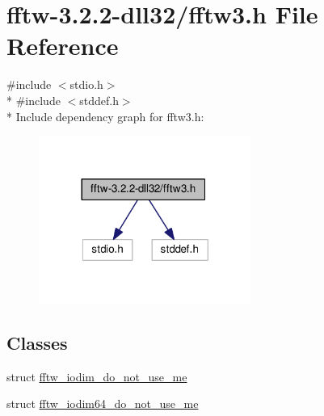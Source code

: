 \hypertarget{fftw-3_82_82-dll32_2fftw3_8h}{\section{fftw-\/3.2.2-\/dll32/fftw3.h File Reference}
\label{fftw-3_82_82-dll32_2fftw3_8h}
}
{\ttfamily \#include $<$stdio.\-h$>$}\\*
{\ttfamily \#include $<$stddef.\-h$>$}\\*
Include dependency graph for fftw3.\-h\-:
\nopagebreak
\begin{figure}[H]
\begin{center}
\leavevmode
\includegraphics[width=197pt]{fftw-3_82_82-dll32_2fftw3_8h__incl}
\end{center}
\end{figure}
\subsection*{Classes}
\begin{DoxyCompactItemize}
\item 
struct \hyperlink{structfftw__iodim__do__not__use__me}{fftw\-\_\-iodim\-\_\-do\-\_\-not\-\_\-use\-\_\-me}
\item 
struct \hyperlink{structfftw__iodim64__do__not__use__me}{fftw\-\_\-iodim64\-\_\-do\-\_\-not\-\_\-use\-\_\-me}
\end{DoxyCompactItemize}
